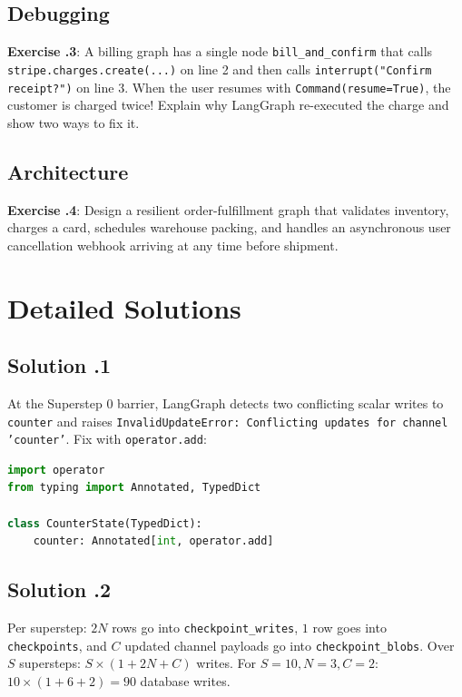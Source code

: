 \subsection*{Debugging}
\textbf{Exercise \thechapter.3}: A billing graph has a single node \texttt{bill\_and\_confirm} that calls \texttt{stripe.charges.create(...)} on line 2 and then calls \texttt{interrupt("Confirm receipt?")} on line 3. When the user resumes with \texttt{Command(resume=True)}, the customer is charged twice! Explain why LangGraph re-executed the charge and show two ways to fix it.

\subsection*{Architecture}
\textbf{Exercise \thechapter.4}: Design a resilient order-fulfillment graph that validates inventory, charges a card, schedules warehouse packing, and handles an asynchronous user cancellation webhook arriving at any time before shipment.

\section{Detailed Solutions}

\subsection*{Solution \thechapter.1}
At the Superstep 0 barrier, LangGraph detects two conflicting scalar writes to \texttt{counter} and raises \texttt{InvalidUpdateError: Conflicting updates for channel 'counter'}. Fix with \texttt{operator.add}:
\begin{lstlisting}[language=Python]
import operator
from typing import Annotated, TypedDict

class CounterState(TypedDict):
    counter: Annotated[int, operator.add]
\end{lstlisting}

\subsection*{Solution \thechapter.2}
Per superstep: $2N$ rows go into \texttt{checkpoint\_writes}, $1$ row goes into \texttt{checkpoints}, and $C$ updated channel payloads go into \texttt{checkpoint\_blobs}. Over $S$ supersteps: $S \times (1 + 2N + C)$ writes. For $S=10, N=3, C=2$: $10 \times (1 + 6 + 2) = 90$ database writes.

